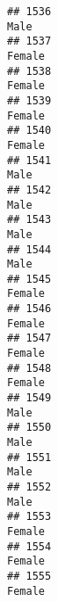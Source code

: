 \documentclass[]{article}
\begin{document}
\begin{verbatim}
## 1536                                                                                                                            Male
## 1537                                                                                                                          Female
## 1538                                                                                                                          Female
## 1539                                                                                                                          Female
## 1540                                                                                                                          Female
## 1541                                                                                                                            Male
## 1542                                                                                                                            Male
## 1543                                                                                                                            Male
## 1544                                                                                                                            Male
## 1545                                                                                                                          Female
## 1546                                                                                                                          Female
## 1547                                                                                                                          Female
## 1548                                                                                                                          Female
## 1549                                                                                                                            Male
## 1550                                                                                                                            Male
## 1551                                                                                                                            Male
## 1552                                                                                                                            Male
## 1553                                                                                                                          Female
## 1554                                                                                                                          Female
## 1555                                                                                                                          Female

\end{verbatim}
\end{document}
